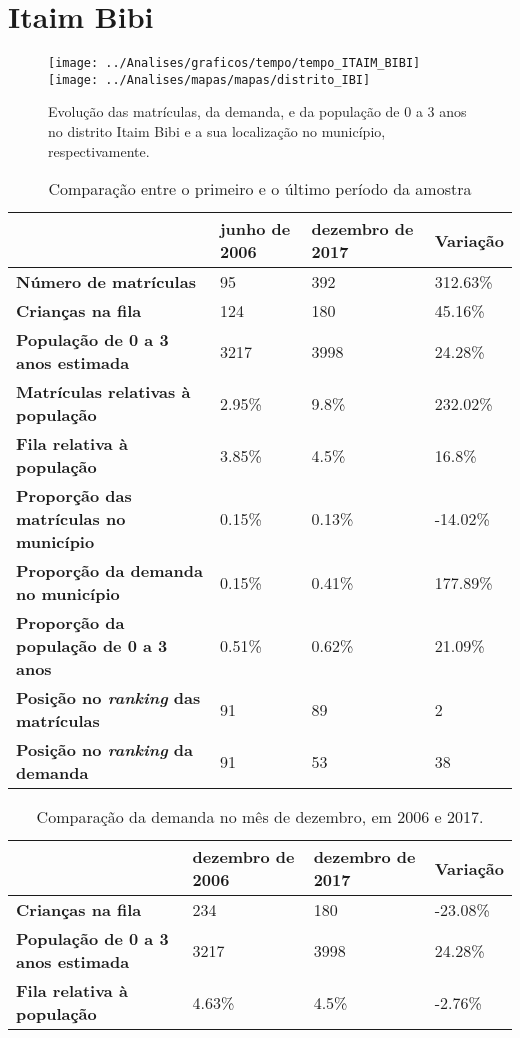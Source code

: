 \section{Itaim Bibi}
\begin{figure}[H]
\centering
\texttt{[image: ../Analises/graficos/tempo/tempo\_ITAIM\_BIBI]}
\texttt{[image: ../Analises/mapas/mapas/distrito\_IBI]}
\caption{Evolução das matrículas, da demanda, e da população de 0 a 3 anos no distrito Itaim Bibi e a sua localização no município, respectivamente.}
\end{figure}
\begin{table}[H]
\begin{tabular}{l|l|l|l}
\textbf{}                                      & \textbf{junho de 2006}       & \textbf{dezembro de 2017}    & \textbf{Variação} \\ \hline
\textbf{Número de matrículas}                  & 95 & 392 & 312.63\% \\ \hline
\textbf{Crianças na fila}                      & 124 & 180 & 45.16\% \\ \hline
\textbf{População de 0 a 3 anos estimada}      & 3217 & 3998 & 24.28\% \\ \hline
\textbf{Matrículas relativas à população}      & 2.95\% & 9.8\% & 232.02\% \\ \hline
\textbf{Fila relativa à população}             & 3.85\% & 4.5\% & 16.8\% \\ \hline
\textbf{Proporção das matrículas no município} & 0.15\% & 0.13\% & -14.02\% \\ \hline
\textbf{Proporção da demanda no município}     & 0.15\% & 0.41\% & 177.89\% \\ \hline
\textbf{Proporção da população de 0 a 3 anos}  & 0.51\% & 0.62\% & 21.09\% \\ \hline
\textbf{Posição no \textit{ranking} das matrículas}     & 91 & 89 & 2 \\ \hline
\textbf{Posição no \textit{ranking} da demanda}         & 91 & 53 & 38 \\ 
\end{tabular}
\caption{Comparação entre o primeiro e o último período da amostra}
\end{table}
\begin{table}[H]
\begin{tabular}{l|l|l|l}
\textbf{}                                 & \textbf{dezembro de 2006} & \textbf{dezembro de 2017} & \textbf{Variação} \\ \hline
\textbf{Crianças na fila}                      & 234 & 180 & -23.08\% \\ \hline
\textbf{População de 0 a 3 anos estimada}      & 3217 & 3998 & 24.28\% \\ \hline
\textbf{Fila relativa à população}             & 4.63\% & 4.5\% & -2.76\% \\
\end{tabular}
\caption{Comparação da demanda no mês de dezembro, em 2006 e 2017.}
\end{table}
